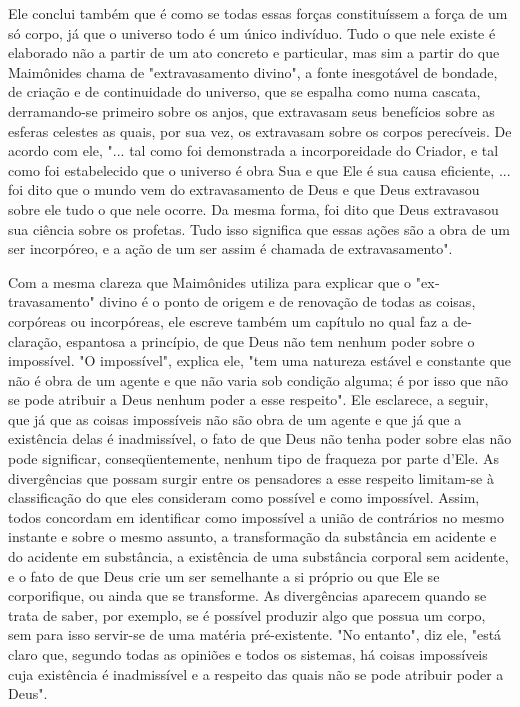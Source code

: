 \begin{itemize}
\begin{enumrate}
Ele conclui também que é como se todas essas forças constituíssem a
força de um só corpo, já que o universo todo é um único indivíduo. Tudo
o que nele existe é elaborado não a partir de um ato concreto e
particular, mas sim a partir do que Maimônides chama de "extravasamento
divino", a fonte inesgotável de bondade, de criação e de continuidade do
universo, que se es­palha como numa cascata, derramando-se primeiro
sobre os anjos, que extra­vasam seus benefícios sobre as esferas
celestes as quais, por sua vez, os extrava­sam sobre os corpos
perecíveis. De acordo com ele, "... tal como foi demons­trada a
incorporeidade do Criador, e tal como foi estabelecido que o universo é
obra Sua e que Ele é sua causa eficiente, ... foi dito que o mundo vem
do extravasamento de Deus e que Deus extravasou sobre ele tudo o que
nele ocorre. Da mesma forma, foi dito que Deus extravasou sua ciência
sobre os profetas. Tudo isso significa que essas ações são a obra de um
ser incorpóreo, e a ação de um ser assim é chamada de extravasamento".

Com a mesma clareza que Maimônides utiliza para explicar que o
"ex­travasamento" divino é o ponto de origem e de renovação de todas as
coisas, corpóreas ou incorpóreas, ele escreve também um capítulo no qual
faz a de-
claração, espantosa a princípio, de que Deus não tem nenhum poder sobre
o impossível. "O impossível", explica ele, "tem uma natureza estável e
constan­te que não é obra de um agente e que não varia sob condição
alguma; é por isso que não se pode atribuir a Deus nenhum poder a esse
respeito". Ele escla­rece, a seguir, que já que as coisas impossíveis
não são obra de um agente e que já que a existência delas é
inadmissível, o fato de que Deus não tenha po­der sobre elas não pode
significar, conseqüentemente, nenhum tipo de fraque­za por parte d'Ele.
As divergências que possam surgir entre os pensadores a es­se respeito
limitam-se à classificação do que eles consideram como possível e como
impossível. Assim, todos concordam em identificar como impossível a
união de contrários no mesmo instante e sobre o mesmo assunto, a
transfor­mação da substância em acidente e do acidente em substância, a
existência de uma substância corporal sem acidente, e o fato de que Deus
crie um ser seme­lhante a si próprio ou que Ele se corporifique, ou
ainda que se transforme. As divergências aparecem quando se trata de
saber, por exemplo, se é possível pro­duzir algo que possua um corpo,
sem para isso servir-se de uma matéria pré-exis­tente. "No entanto", diz
ele, "está claro que, segundo todas as opiniões e to­dos os sistemas, há
coisas impossíveis cuja existência é inadmissível e a respei­to das
quais não se pode atribuir poder a Deus".


\end{enumrate}
\end{itemize}
